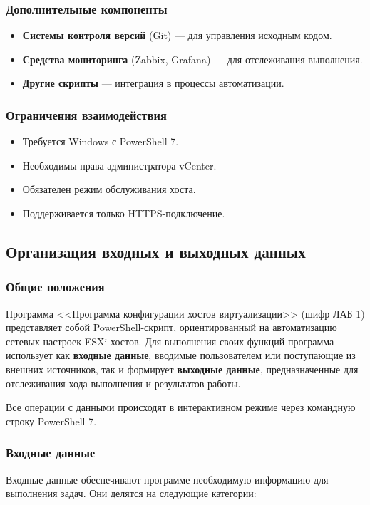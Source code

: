\subsubsection{Дополнительные компоненты}
\begin{itemize}
    \item \textbf{Системы контроля версий} (Git) — для управления исходным кодом.
    \item \textbf{Средства мониторинга} (Zabbix, Grafana) — для отслеживания выполнения.
    \item \textbf{Другие скрипты} — интеграция в процессы автоматизации.
\end{itemize}

\subsubsection{Ограничения взаимодействия}
\begin{itemize}
    \item Требуется Windows с PowerShell 7.
    \item Необходимы права администратора vCenter.
    \item Обязателен режим обслуживания хоста.
    \item Поддерживается только HTTPS-подключение.
\end{itemize}

\subsection{Организация входных и выходных данных}

\subsubsection{Общие положения}
Программа <<Программа конфигурации хостов виртуализации>> (шифр ЛАБ 1) представляет собой PowerShell-скрипт, ориентированный на автоматизацию сетевых настроек ESXi-хостов. Для выполнения своих функций программа использует как \textbf{входные данные}, вводимые пользователем или поступающие из внешних источников, так и формирует \textbf{выходные данные}, предназначенные для отслеживания хода выполнения и результатов работы.

Все операции с данными происходят в интерактивном режиме через командную строку PowerShell 7.

\subsubsection{Входные данные}
Входные данные обеспечивают программе необходимую информацию для выполнения задач. Они делятся на следующие категории:

